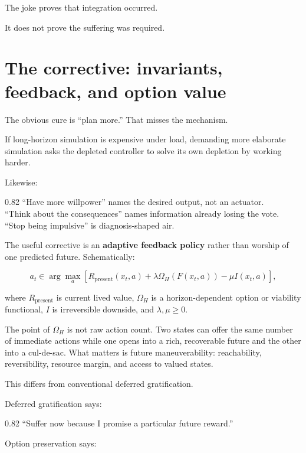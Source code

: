 \documentclass[10pt,letterpaper]{article}
\newenvironment{paperbody}
  {\begingroup\justifying}
  {\par\endgroup}
\newenvironment{voicebox}
  {\Needspace{3.5\baselineskip}\par\vspace{0.22em}\begin{center}\begingroup
   \begin{lrbox}{\voiceboxsave}\begin{varwidth}{0.82\linewidth}
   \small\rmfamily\upshape\RaggedRight}
  {\end{varwidth}\end{lrbox}\fbox{\usebox{\voiceboxsave}}
   \endgroup\end{center}\vspace{0.22em}}
\let\oldsection\section
\renewcommand{\section}{\Needspace{6\baselineskip}\oldsection}
\begin{document}
\begin{paperbody}
The joke proves that integration occurred.

It does not prove the suffering was required.

\section{The corrective: invariants, feedback, and option
value}\label{the-corrective-invariants-feedback-and-option-value}

The obvious cure is ``plan more.'' That misses the mechanism.

If long-horizon simulation is expensive under load, demanding more
elaborate simulation asks the depleted controller to solve its own
depletion by working harder.

Likewise:

\begin{voicebox}
``Have more willpower'' names the desired output, not an actuator.\\
``Think about the consequences'' names information already losing the
vote.\\
``Stop being impulsive'' is diagnosis-shaped air.
\end{voicebox}

The useful corrective is an \textbf{adaptive feedback policy} rather
than worship of one predicted future. Schematically:

\[
a_t\in\arg\max_a
\left[
R_{\mathrm{present}}(x_t,a)
+
\lambda\Omega_H(F(x_t,a))
-
\mu I(x_t,a)
\right],
\]

where \(R_{\mathrm{present}}\) is current lived value, \(\Omega_H\) is a
horizon-dependent option or viability functional, \(I\) is irreversible
downside, and \(\lambda,\mu\ge 0\).

The point of \(\Omega_H\) is not raw action count. Two states can offer
the same number of immediate actions while one opens into a rich,
recoverable future and the other into a cul-de-sac. What matters is
future maneuverability: reachability, reversibility, resource margin,
and access to valued states.

This differs from conventional deferred gratification.

Deferred gratification says:

\begin{voicebox}
``Suffer now because I promise a particular future reward.''
\end{voicebox}

Option preservation says:


\end{paperbody}
\end{document}
